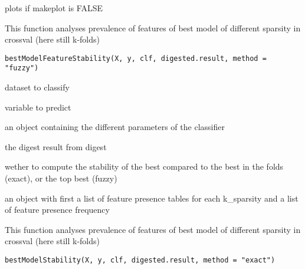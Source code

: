 \documentclass[a4paper]{book}
\begin{document}
%
\begin{Value}
plots if makeplot is FALSE
\end{Value}
%
\begin{Description}
This function analyses prevalence of features of best model of different sparsity in crossval (here still k-folds)
\end{Description}
%
\begin{Usage}
\begin{verbatim}
bestModelFeatureStability(X, y, clf, digested.result, method = "fuzzy")
\end{verbatim}
\end{Usage}
%
\begin{Arguments}
\begin{ldescription}
\item[\code{X:}] dataset to classify

\item[\code{y:}] variable to predict

\item[\code{clf:}] an object containing the different parameters of the classifier

\item[\code{digested.result:}] the digest result from digest

\item[\code{method:}] wether to compute the stability of the best compared to the best in the folds (exact), or the top best (fuzzy)
\end{ldescription}
\end{Arguments}
%
\begin{Value}
an object with first a list of feature presence tables for each k\_sparsity and a list of feature presence frequency
\end{Value}
%
\begin{Description}
This function analyses prevalence of features of best model of different sparsity in crossval (here still k-folds)
\end{Description}
%
\begin{Usage}
\begin{verbatim}
bestModelStability(X, y, clf, digested.result, method = "exact")
\end{verbatim}
\end{Usage}
%
\end{document}
